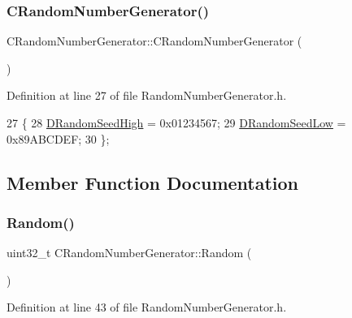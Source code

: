 \subsubsection{\texorpdfstring{C\+Random\+Number\+Generator()}{CRandomNumberGenerator()}}
{\footnotesize\ttfamily C\+Random\+Number\+Generator\+::\+C\+Random\+Number\+Generator (\begin{DoxyParamCaption}{ }\end{DoxyParamCaption})\hspace{0.3cm}{\ttfamily [inline]}}



Definition at line 27 of file Random\+Number\+Generator.\+h.


\begin{DoxyCode}
27                                 \{
28             \hyperlink{classCRandomNumberGenerator_a450670f954d6ccb3cc39d7eebbf889c6}{DRandomSeedHigh} = 0x01234567;
29             \hyperlink{classCRandomNumberGenerator_a33bf3bb9bc1378f4142932a01a3e2cfd}{DRandomSeedLow} = 0x89ABCDEF;
30         \};
\end{DoxyCode}


\subsection{Member Function Documentation}
\hypertarget{classCRandomNumberGenerator_aa7fc51bde5647d15df2f1b9826702ca2}{}\label{classCRandomNumberGenerator_aa7fc51bde5647d15df2f1b9826702ca2} 
\subsubsection{\texorpdfstring{Random()}{Random()}}
{\footnotesize\ttfamily uint32\+\_\+t C\+Random\+Number\+Generator\+::\+Random (\begin{DoxyParamCaption}{ }\end{DoxyParamCaption})\hspace{0.3cm}{\ttfamily [inline]}}



Definition at line 43 of file Random\+Number\+Generator.\+h.


